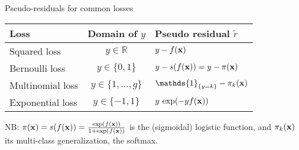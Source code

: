 \documentclass[11pt,compress,t,notes=noshow, xcolor=table]{beamer}
\begin{document}
\begin{frame}{Pseudo-residuals for common losses}

\vfill

\begin{table}[ht]
\centering
\begin{tabular}{|l|c|l|}
\hline
\textbf{Loss} & \textbf{Domain of $y$} & \textbf{Pseudo residual $\tilde r$} \\ \hline
Squared loss & $y \in \mathbb{R}$ & $y - f(\mathbf{x})$ \\ \hline
Bernoulli loss & $y \in \{0,1\}$ & $y - s(f(\mathbf{x}))=y-\pi(\mathbf{x})$ \\ \hline
Multinomial loss & $y \in \{1,\dots,g\}$ & $\mathds{1}_{\{y=k\}} - \pi_k(\xv)$ \\ \hline
Exponential loss & $y \in \{-1,1\}$ & $y\,\exp(-yf(\mathbf{x}))$ \\ \hline
\end{tabular}
\end{table}

\vfill

NB: $\pi(\mathbf{x})=s(f(\mathbf{x}))=\frac{\exp(f(\mathbf{x}))}{1+\exp(f(\mathbf{x}))}$ is the (sigmoidal) logistic function,
and $\pi_k(\mathbf{x})$ its multi-class generalization, the softmax.

\end{frame}



\endlecture
\end{document}
